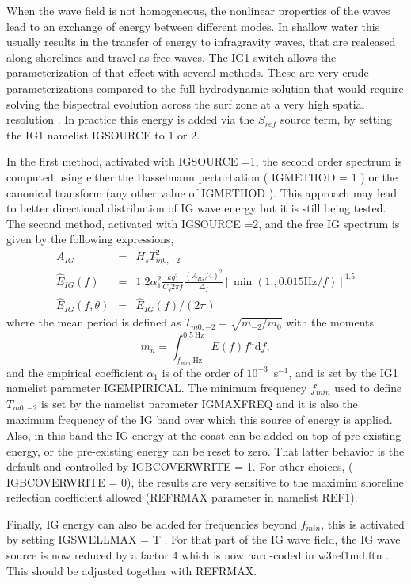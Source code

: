 When the wave field is not homogeneous, the nonlinear properties of the waves lead to 
an exchange of energy between different modes. In shallow water this usually results in the 
transfer of energy to infragravity waves, that are realeased along shorelines and travel 
as free waves. The IG1 switch allows the parameterization of that effect with several methods.
These are very crude parameterizations compared to the full hydrodynamic solution that would 
require solving the bispectral evolution across the surf zone at a very high spatial resolution 
\citep[e.g.][]{art:HB97}.  
In practice this energy is added via the $S_{ref}$ source term, by setting the 
IG1 namelist IGSOURCE to 1 or 2. 

In the first method, activated with IGSOURCE =1, the second order spectrum is computed 
using either the Hasselmann perturbation ( IGMETHOD = 1 ) or the canonical transform (any other 
value of IGMETHOD ). This approach may lead to better directional distribution of IG wave 
energy but it is still being tested.  The second method, activated with IGSOURCE =2, and 
the free IG spectrum is given by the following expressions, 
\begin{eqnarray}
 A_{IG} & =&    H_s T_{m0,-2}^2\label{eq:IGfit0} \\
\widehat{E}_{IG}(f)& = & 1.2 \alpha_1^2 \frac{k g^2}{C_g 2 \pi f} \frac{(A_{IG}/4)^2}{\Delta_f}  
\left[\min( 1., 0.015\mathrm{Hz}/ f)\right]^{1.5} \label{eq:IGfit1} \\
 \widehat{E}_{IG}(f,\theta) & = & \widehat{E}_{IG}(f) / (2 \pi )
\label{eq:fit2} 
\end{eqnarray}
where the mean period is defined as $ T_{m0,-2} =\sqrt{m_{-2}/m_{0}}$ with 
the moments 
\begin{equation}
 m_n= \int_{f_{min}~\mathrm{Hz}}^{0.5~\mathrm{Hz}} E(f) f^n {\mathrm d}f,\label{eq:mn}
\end{equation}
and the empirical coefficient $\alpha_1$ is of the order of $10^{-3}$~s$^{-1}$, and is set by the IG1 namelist 
parameter IGEMPIRICAL. The minimum frequency $f_{min}$ used to define  $ T_{m0,-2}$ is set by the namelist parameter IGMAXFREQ
and it is also the maximum frequency of the IG band over which this source of energy is applied. 
Also, in this band the IG energy at the coast can be added on top of pre-existing energy, or the pre-existing energy 
can be reset to zero. That latter behavior is the default and controlled by IGBCOVERWRITE = 1. For other choices, 
( IGBCOVERWRITE = 0), the results are very sensitive to the maximim shoreline reflection coefficient allowed (REFRMAX parameter 
in namelist REF1). 

Finally, IG energy can also be added for frequencies beyond $f_{min}$, this is activated by setting IGSWELLMAX = T . 
For that part of the IG wave field, the IG wave source is now reduced by a factor 4 which is 
now hard-coded in w3ref1md.ftn . This should be adjusted together 
with REFRMAX.




